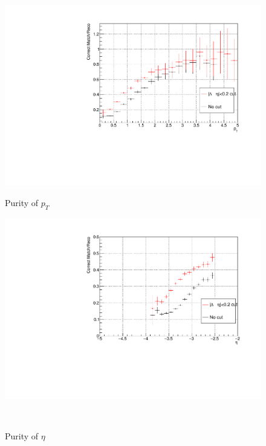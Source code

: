 \begin{figure}[htbp]
                \\
                \vspace{1em}
                \begin{minipage}{0.45\textwidth}
                \centering
                \includegraphics[width=\textwidth]{fig/3_5_6_purity_pt.pdf}
                    \caption{Purity of $p_T$}
                \end{minipage}
                \hfill
                \begin{minipage}{0.45\textwidth}
                    \centering
                    \includegraphics[width=\textwidth]{fig/3_5_6_purity_eta.pdf}
                \caption{Purity of $\eta$} 
                \end{minipage}
                \\

\end{figure}
